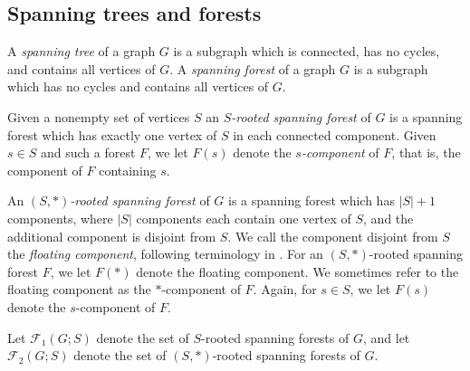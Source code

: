 \documentclass[12pt]{amsart}
\theoremstyle{definition}
\newcommand{\trees}{\mathcal{F}_1}
\newcommand{\forests}{\mathcal{F}}
\begin{document}



\subsection{Spanning trees and forests}

A {\em spanning tree} of a graph $G$ is a subgraph which 
is connected, has no cycles,
and contains all vertices of $G$.
A {\em spanning forest} of a graph $G$ is a subgraph which 
has no cycles
and  contains all vertices of $G$. 



Given a nonempty set of vertices $S$  %
an {\em $S$-rooted spanning forest} of $G$ 
is a spanning forest which has exactly one vertex of $S$ in each connected component.
Given $s \in S$ and such a forest $F$, we let $F(s)$ denote the {\em $s$-component} of $F$, that is, the component of $F$ containing $s$.

An {\em $(S,*)$-rooted spanning forest} of $G$ is a spanning forest which has $|S|+1$ components, where $|S|$ components each contain one vertex of $S$, and the additional component is disjoint from $S$.
We call the component disjoint from $S$ the {\em floating component}, following terminology in \cite{kassel-kenyon-wu}.
For an $(S,*)$-rooted spanning forest $F$, we let $F(*)$ denote the floating component. We sometimes refer to the floating component as the $*$-component of $F$. Again, for $s \in S$, we let $F(s)$ denote the $s$-component of $F$.

Let $\trees(G;S)$ denote the set of $S$-rooted spanning forests of $G$,
and let $\forests_2(G;S)$ denote the set of $(S,*)$-rooted spanning forests of $G$.
\end{document}
